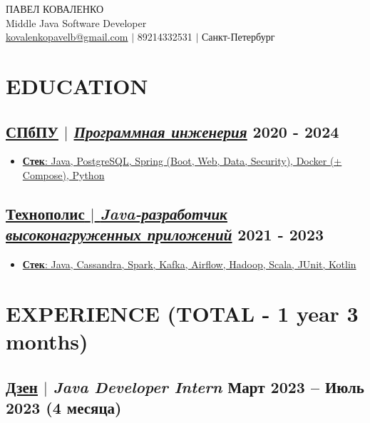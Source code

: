 \documentclass[11pt]{article}
\begin{document}
\begin{center}
    {\fontsize{36}{36}\selectfont ПАВЕЛ КОВАЛЕНКО} \\ \bigskip
    {\fontsize{25}{25}\selectfont Middle Java Software Developer} \\ \bigskip
    {\color{icnclr}\faEnvelope[email]} \href{mailto:kovalenkopavelb@gmail.com}{kovalenkopavelb@gmail.com} $|$ 
    {\color{icnclr}} 89214332531 $|$
    {\color{icnclr}\faMapMarker} Санкт-Петербург
\end{center}

\section{EDUCATION}
\subsection{\href{https://www.spbstu.ru/}{\underline{СПбПУ}} $|$ {\normalfont\textit{\href{https://www.spbstu.ru/structure/graduate_school_software_engineering/}{\underline{Программная инженерия}}}} \hfill 2020 - 2024}
\begin{itemize}
    \item \underline{\textbf{Стек}: Java, PostgreSQL, Spring (Boot, Web, Data, Security), Docker (+ Compose), Python}
\end{itemize}

\subsection{\href{https://polis.vk.company/}{\underline{Технополис} $|$ {\normalfont\textit{\underline{Java-разработчик высоконагруженных приложений}}}} \hfill 2021 - 2023}
\begin{itemize}
    \item \underline{\textbf{Стек}: Java, Cassandra, Spark, Kafka, Airflow, Hadoop, Scala, JUnit, Kotlin}
\end{itemize}

\section{EXPERIENCE (TOTAL - 1 year 3 months)}
\subsection{\href{https://dzen.ru}{\underline{Дзен}} $|$ {\normalfont\textit{Java Developer Intern}} \hfill Март 2023 -- Июль 2023 (4 месяца)}
\end{document}
